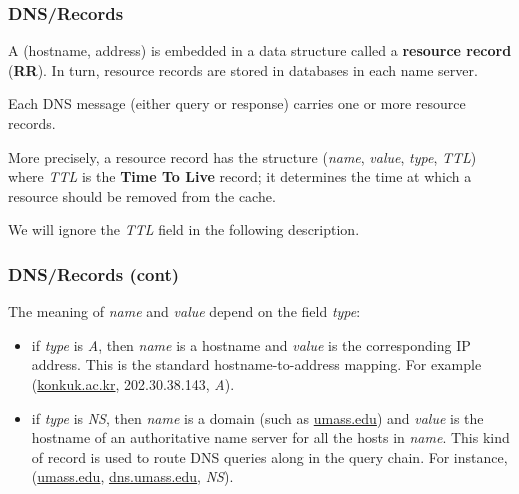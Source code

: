 %
\begin{frame}
\frametitle{DNS/Records}

A (hostname, address) is embedded in a data structure called a
\textbf{resource record} (\textbf{RR}). In turn, resource records are
stored in databases in each name server.

Each DNS message (either query or response) carries one or
more resource records.

More precisely, a resource record has the structure (\emph{name},
\emph{value}, \emph{type}, \emph{TTL}) where \emph{TTL} is the
\textbf{Time To Live} record; it determines the time at which a
resource should be removed from the cache.

We will ignore the \emph{TTL} field in the following description.

\end{frame}

%
\begin{frame}
\frametitle{DNS/Records (cont)}

The meaning of \emph{name} and \emph{value} depend on the field
\emph{type}:

\begin{itemize}

  \item if \emph{type} is \emph{A}, then \emph{name} is a hostname and
  \emph{value} is the corresponding IP address. This is the standard
  hostname-to-address mapping. For example (\url{konkuk.ac.kr},
  202.30.38.143, \emph{A}).

  \item if \emph{type} is \emph{NS}, then \emph{name} is a domain
  (such as \url{umass.edu}) and \emph{value} is the hostname of an
  authoritative name server for all the hosts in \emph{name}. This
  kind of record is used to route DNS queries along in the
  query chain. For instance, (\url{umass.edu}, \url{dns.umass.edu},
  \emph{NS}).

\end{itemize}

\end{frame}

